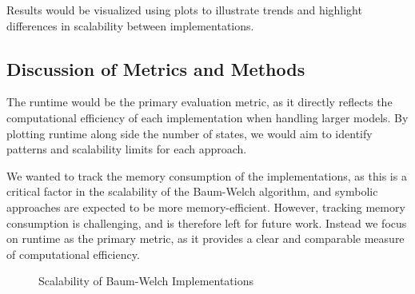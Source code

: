 Results would be visualized using plots to illustrate trends and highlight differences in scalability between implementations.

\subsection{Discussion of Metrics and Methods}
The runtime would be the primary evaluation metric, as it directly reflects the computational efficiency of each implementation when handling larger models. 
By plotting runtime along side the number of states, we would aim to identify patterns and scalability limits for each approach.

We wanted to track the memory consumption of the implementations, as this is a critical factor in the scalability of the Baum-Welch algorithm, and symbolic approaches are expected to be more memory-efficient.
However, tracking memory consumption is challenging, and is therefore left for future work.
Instead we focus on runtime as the primary metric, as it provides a clear and comparable measure of computational efficiency.


\begin{figure}[htb!]
    \centering
    
    \caption{Scalability of Baum-Welch Implementations}
    \label{fig:scalability}
\end{figure}